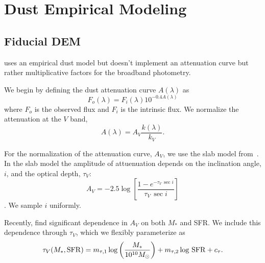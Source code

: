 \section{Dust Empirical Modeling} \label{sec:methods}
\subsection{Fiducial DEM} \label{sec:dem}

\cite{trayford2015} uses an empirical dust model but doesn't implement an
attenuation curve but rather multiplicative factors for the broadband
photometry.

We begin by defining the dust attenuation curve $A(\lambda)$ as 
\begin{equation} 
    F_o (\lambda) = F_i (\lambda) 10^{-0.4 A(\lambda)}
\end{equation}
where $F_o$ is the observed flux and $F_i$ is the intrinsic flux. We normalize the attenuation at the $V$ band, 
\begin{equation} 
    A(\lambda) = A_V \frac{k(\lambda)}{k_V}. 
\end{equation}

For the normalization of the attenuation curve, $A_V$, we use the slab model
from~\cite{somerville1999, somerville2012}. In the slab model the amplitude of
attuenuation depends on the inclination angle, $i$, and the optical depth,
$\tau_V$: 
\begin{equation} \label{eq:slab}
    A_V = -2.5 \log \left[ \frac{1 - e^{-\tau_V\,\sec i}}{\tau_V\,\sec i} \right]
\end{equation}
. We sample $i$ uniformly.

Recently, \cite{salim2020} find significant dependence in $A_V$ on both $M_*$
and SFR. We include this dependence through $\tau_V$, which we flexibly
parameterize as 
\begin{equation} \label{eq:tauv}
    \tau_V(M_*, {\rm SFR}) = m_{\tau,1} \log \left(\frac{M_*}{10^{10} M_\odot}\right) +
    m_{\tau,2} \log\,{\rm SFR} + c_\tau.
\end{equation}

